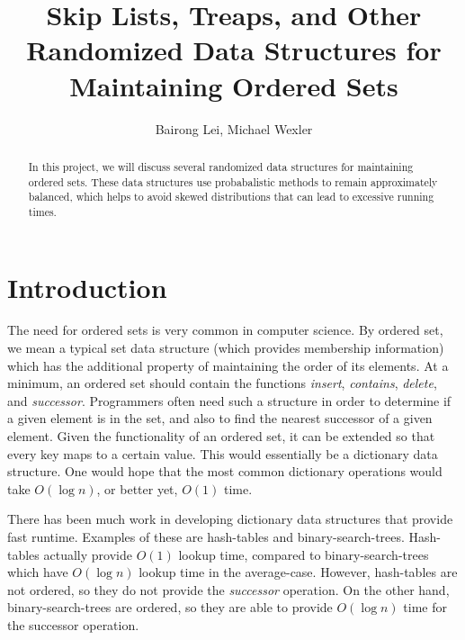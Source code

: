 \documentclass[oribibl]{llncs}
\begin{document}
\title{ Skip Lists, Treaps, and Other Randomized Data Structures for Maintaining Ordered Sets}

\author{Bairong Lei, Michael Wexler}


\maketitle

\begin{abstract}
  In this project, we will discuss several randomized data structures for maintaining ordered sets. These
  data structures use probabalistic methods to remain approximately balanced, which helps to avoid skewed distributions that can lead to excessive running times. 
\end{abstract}


\section{Introduction}

The need for ordered sets is very common in computer science. By ordered set, we mean a typical set data structure (which provides membership information) which has the additional property of maintaining the order of its elements. At a minimum, an ordered set should contain the functions {\it insert}, {\it contains}, {\it delete}, and {\it successor}. Programmers often need such a structure in order to determine if a given element is in the set, and also to find the nearest successor of a given element. Given the functionality of an ordered set, it can be extended so that every key maps to a certain value. This would essentially be a dictionary data structure. One would hope that the most common dictionary operations would take $O(\log{n})$, or better yet, $O(1)$ time.

There has been much work in developing dictionary data structures that provide fast runtime. Examples of these are hash-tables and binary-search-trees. Hash-tables actually provide $O(1)$ lookup time, compared to binary-search-trees which have $O(\log{n})$ lookup time in the average-case. However, hash-tables are not ordered, so they do not provide the {\it successor} operation. On the other hand, binary-search-trees are ordered, so they are able to provide $O(\log{n})$ time for the successor operation.
 
\end{document}
